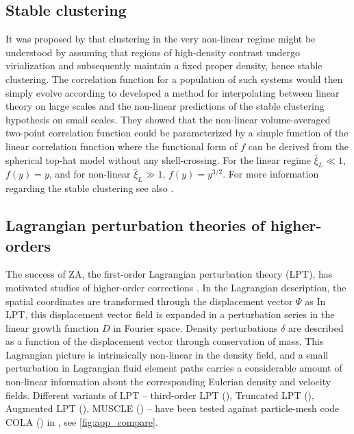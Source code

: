 \subsection{Stable clustering}
It was proposed by \textcite{1974ApJ...189L..51P} that clustering in the very non-linear regime might be understood by assuming that regions of high-density contrast undergo virialization and subsequently maintain a fixed proper density, hence stable clustering. The correlation function for a population of such systems would then simply evolve according to
\textcite{1991ApJ...374L...1H} developed a method for interpolating between linear theory on large scales and the non-linear predictions of the stable clustering hypothesis on small scales. They showed that the non-linear volume-averaged two-point correlation function could be parameterized by a simple function of the linear correlation function
where the functional form of $f$ can be derived from the spherical top-hat model without any shell-crossing. For the linear regime $\bar\xi_{L}\ll1$, $f(y)=y$, and for non-linear $\bar\xi_{L}\gg1$, $f(y)=y^{3/2}$. For more information regarding the stable clustering see  also \textcite{1996MNRAS.280L..19P,2003MNRAS.341.1311S}.
\subsection{Lagrangian perturbation theories of higher-orders}
The success of ZA, the first-order Lagrangian perturbation theory (LPT), has motivated studies of higher-order corrections \parencite[see e.g.][]{10.1093/mnras/264.2.375,2002PhR...367....1B,2010MNRAS.403.1859J,2014ApJ...788...63S}. In the Lagrangian description, the spatial coordinates are transformed through the displacement vector $\Psi$ as
In LPT, this displacement vector field is expanded in a perturbation series in the linear growth function $D$ in Fourier space. Density perturbations $\delta$ are described as a function of the displacement vector through conservation of mass. This Lagrangian picture is intrinsically non-linear in the density field, and a small perturbation in Lagrangian fluid element paths carries a considerable amount of non-linear information about the corresponding Eulerian density and velocity fields. Different variants of LPT -- third-order LPT (\cite{10.1093/mnras/264.2.375}), Truncated LPT (\cite{1993MNRAS.260..765C}), Augmented LPT (\cite{10.1093/mnrasl/slt101}), MUSCLE (\cite{10.1093/mnrasl/slv141}) -- have been tested against particle-mesh code COLA (\cite{2013JCAP...06..036T}) in \cite{2017JCAP...07..050M}, see \autoref{fig:app_compare}.

